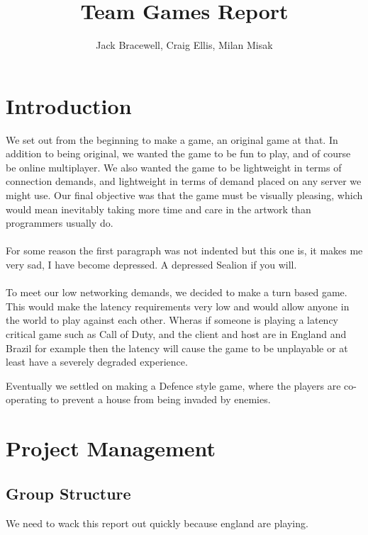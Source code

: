 \documentclass{article}
\begin{document}
\title{Team Games Report}
\author{Jack Bracewell, Craig Ellis, Milan Misak}
\date{}

\maketitle
\vspace{1.5cm}
\tableofcontents
\clearpage

\section{Introduction}
We set out from the beginning to make a game, an original game at that. In addition to being original, we wanted the game to be fun to play, and of course be online multiplayer. We also wanted the game to be lightweight in terms of connection demands, and lightweight in terms of demand placed on any server we might use. Our final objective was that the game must be visually pleasing, which would mean inevitably taking more time and care in the artwork than programmers usually do. \\ \\

For some reason the first paragraph was not indented but this one is, it makes me very sad, I have become depressed. A depressed Sealion if you will. \\ \\

To meet our low networking demands, we decided to make a turn based game. This would make the latency requirements very low and would allow anyone in the world to play against each other. Wheras if someone is playing a latency critical game such as Call of Duty, and the client and host are in England and Brazil for example then the latency will cause the game to be unplayable or at least have a severely degraded experience.

Eventually we settled on making a Defence style game, where the players are co-operating to prevent a house from being invaded by enemies.




\section{Project Management}
\subsection{Group Structure}
We need to wack this report out quickly because england are playing.
\end{document}

